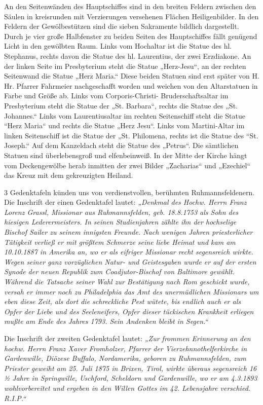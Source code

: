 \documentclass[12pt,a4paper]{book}
\begin{document}
An den Seitenwänden des Hauptschiffes sind in den breiten Feldern
zwischen den Säulen in kreisrunden mit Verzierungen versehenen Flächen
Heiligenbilder. In den Feldern der Gewölbestützen sind die sieben
Sakramente bildlich dargestellt. Durch je vier große Halbfenster zu
beiden Seiten des Hauptschiffes fällt genügend Licht in den gewölbten
Raum. Links vom Hochaltar ist die Statue des hl. Stephanus, rechts davon
die Statue des hl. Laurentius, der zwei Erzdiakone. An der linken Seite
im Presbyterium steht die Statue „Herz-Jesu“, an der rechten Seitenwand
die Statue „Herz Maria.“ Diese beiden Statuen sind erst später von H.
Hr. Pfarrer Fahrmeier nachgeschafft worden und weichen von den
Altarstatuen in Farbe und Größe ab. Links vom Corporis-Christi-
Bruderschaftsaltar im Presbyterium steht die Statue der „St. Barbara“,
rechts die Statue des „St. Johannes.“ Links vom Laurentiusaltar im
rechten Seitenschiff steht die Statue “Herz Maria“ und rechts die Statue
„Herz Jesu“. Links vom Martini-Altar im linken Seitenschiff ist die
Statue der „St. Philomena, rechts ist die Statue des “St. Joseph.“ Auf
dem Kanzeldach steht die Statue des „Petrus“. Die sämtlichen Statuen
sind überlebensgroß und elfenbeinweiß. In der Mitte der Kirche hängt vom
Deckengewölbe herab inmitten der zwei Bilder „Zacharias“ und „Ezechiel“
das Kreuz mit dem gekreuzigten Heiland.

3 Gedenktafeln künden uns von verdienstvollen, berühmten
Ruhmannsfeldenern. Die Inschrift der einen Gedenktafel lautet:
\emph{„Denkmal des Hochw. Herrn Franz Lorenz Grassl, Missionar aus
Ruhmannsfelden, geb. 18.8.1753 als Sohn des hiesigen Lederermeisters. In
seinen Studienjahren zählte ihn der hochselige Bischof Sailer zu seinem
innigsten Freunde. Nach wenigen Jahren priesterlicher Tätigkeit verließ
er mit größtem Schmerze seine liebe Heimat und kam am 10.10.1887 in
Amerika an, wo er als eifriger Missionar recht segensreich wirkte. Wegen
seiner ganz vorzüglichen Natur- und Geistesgaben wurde er auf der ersten
Synode der neuen Republik zum Coadjutor-Bischof von Baltimore gewählt.
Während die Tatsache seiner Wahl zur Bestätigung nach Rom geschickt
wurde, versah er immer noch zu Philadelphia das Amt des unermüdlichen
Missionars um eben diese Zeit, als dort die schreckliche Pest wütete,
bis endlich auch er als Opfer der Liebe und des Seeleneifers, Opfer
dieser tückischen Krankheit erliegen mußte am Ende des Jahres 1793. Sein
Andenken bleibt in Segen.“}

Die Inschrift der zweiten Gedenktafel lautet: \emph{„Zur frommen
Erinnerung an den hochw. Herrn Franz Xaver Fromholzer, Pfarrer der
Vierzehnnothelferkirche in Gardenwille, Diözese Buffalo, Nordamerika,
geboren zu Ruhmannsfelden, zum Priester geweiht am 25. Juli 1875 in
Brixen, Tirol, wirkte überaus segensreich 16 ½ Jahre in Springwille,
Uschford, Scheldorn und Gardenwille, wo er am 4.3.1893 wohlvorbereitet
und ergeben in den Willen Gottes im 42. Lebensjahre verschied. R.I.P.“}
\end{document}
